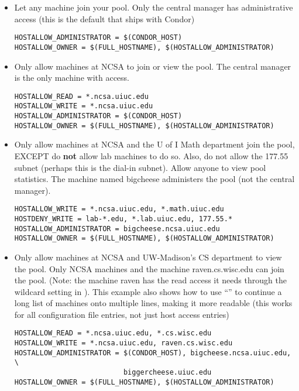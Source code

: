 \begin{itemize}

\item Let any machine join your pool.
Only the central manager has
administrative access (this is the default that ships with Condor)
\begin{verbatim}
HOSTALLOW_ADMINISTRATOR = $(CONDOR_HOST)
HOSTALLOW_OWNER = $(FULL_HOSTNAME), $(HOSTALLOW_ADMINISTRATOR)
\end{verbatim}

\item Only allow machines at NCSA to join or view the pool.
The central manager is the only machine with  access.
\begin{verbatim}
HOSTALLOW_READ = *.ncsa.uiuc.edu
HOSTALLOW_WRITE = *.ncsa.uiuc.edu
HOSTALLOW_ADMINISTRATOR = $(CONDOR_HOST)
HOSTALLOW_OWNER = $(FULL_HOSTNAME), $(HOSTALLOW_ADMINISTRATOR)
\end{verbatim}

\item Only allow machines at NCSA and the U of I Math department join the
pool, EXCEPT do \textbf{not} allow lab machines to do so.
Also, do not
allow the 177.55 subnet (perhaps this is the dial-in subnet).
Allow anyone to view pool statistics.  The machine named
bigcheese administers the pool (not the central manager).
\begin{verbatim}
HOSTALLOW_WRITE = *.ncsa.uiuc.edu, *.math.uiuc.edu
HOSTDENY_WRITE = lab-*.edu, *.lab.uiuc.edu, 177.55.*
HOSTALLOW_ADMINISTRATOR = bigcheese.ncsa.uiuc.edu
HOSTALLOW_OWNER = $(FULL_HOSTNAME), $(HOSTALLOW_ADMINISTRATOR)
\end{verbatim}

\item Only allow machines at NCSA and UW-Madison's CS department to
view the pool.  Only NCSA machines and the machine raven.cs.wisc.edu can join
the pool.
(Note: the machine raven has the read access it needs through the
wildcard setting in ).
This example also shows
how to use ``\verb@\@'' to continue a long list of machines
onto multiple lines, making it more readable (this works for all
configuration file entries, not just host access entries)
\begin{verbatim}
HOSTALLOW_READ = *.ncsa.uiuc.edu, *.cs.wisc.edu
HOSTALLOW_WRITE = *.ncsa.uiuc.edu, raven.cs.wisc.edu
HOSTALLOW_ADMINISTRATOR = $(CONDOR_HOST), bigcheese.ncsa.uiuc.edu, \
                          biggercheese.uiuc.edu
HOSTALLOW_OWNER = $(FULL_HOSTNAME), $(HOSTALLOW_ADMINISTRATOR)
\end{verbatim}


\end{itemize}
